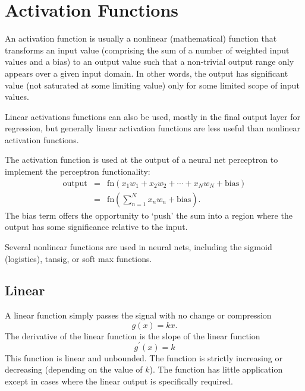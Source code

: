 
\chapter{Activation Functions}
\label{sec:ActivationFunctions}

An activation function is usually a nonlinear (mathematical) function that transforms an input value (comprising the sum of a number of weighted input values and a bias) to an output value such that a non-trivial output range only appears over a given input domain. In other words, the output has significant value (not saturated at some limiting value) only for some limited scope of input values. 

Linear activations functions can also be used, mostly in the final output layer for regression, but generally linear activation functions are less useful than nonlinear activation functions.

The activation function is used at the output of a neural net perceptron to implement the perceptron functionality:
\begin{eqnarray}
\textrm{output} 
&=& \textrm{fn}\left(x_{1} w_{1}+x_{2} w_{2}+\cdots+x_{N} w_{N}+\textrm{bias}\right)\nonumber\\
&=& \textrm{fn}\left(\sum_{n=1}^N x_{n} w_{n}+\textrm{bias}\right)\nonumber.
\end{eqnarray}
The bias term offers the opportunity to `push' the sum into a region where the output has some significance relative to the input.

Several nonlinear functions are used in neural nets, including the sigmoid (logistics), tansig, or soft max
functions\cite{Pedamonti2018,Nwankpa2018,stackexchangeEllefsen2015,WikiPediaHyperbolicfunction2019,NickBecker2017,DustinStansbury2014,HamzaMahmood2018}. 

\section{Linear}

A linear function simply passes the signal with no change or compression
\begin{equation}
g(x)=kx.
\end{equation}  
The derivative of the linear function is the slope of the linear function
\begin{equation}
g^\prime(x) = k
\end{equation}
This function is linear and unbounded. The function is strictly increasing or decreasing (depending on the value of $k$). The function has little application except in cases where the linear output is specifically required.


